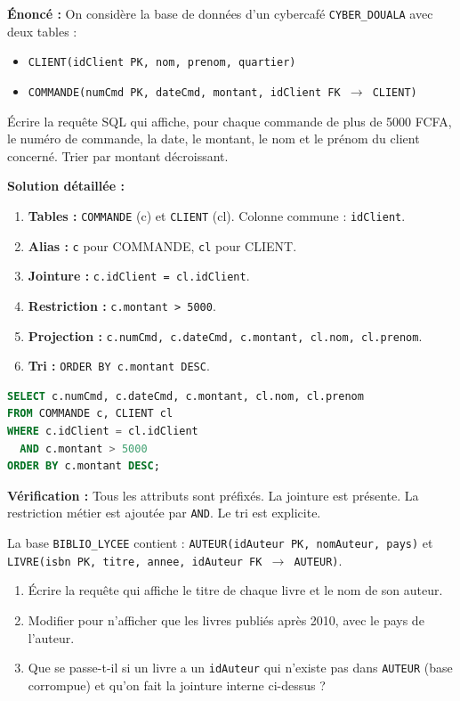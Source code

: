 \documentclass[11pt]{article}
\newcounter{popsec}
\newcounter{popsub}
\newcommand{\courssub}[1]{%
  \stepcounter{popsub}%
  \par\vspace{9pt}\noindent{\popxbold\fontsize{11.5}{13}\selectfont\color{popink}{\color{poporange}\thepopsec.\thepopsub}\hspace{6pt}#1}\par\nopagebreak\vspace{4pt}
}
\begin{document}
\begin{exoresolu}
\textbf{Énoncé :} On considère la base de données d'un cybercafé \texttt{CYBER\_DOUALA} avec deux tables :
\begin{itemize}
\item \texttt{CLIENT(idClient PK, nom, prenom, quartier)}
\item \texttt{COMMANDE(numCmd PK, dateCmd, montant, idClient FK $\rightarrow$ CLIENT)}
\end{itemize}
Écrire la requête SQL qui affiche, pour chaque commande de plus de 5000 FCFA, le numéro de commande, la date, le montant, le nom et le prénom du client concerné. Trier par montant décroissant.

\textbf{Solution détaillée :}
\begin{enumerate}
\item \textbf{Tables :} \texttt{COMMANDE} (c) et \texttt{CLIENT} (cl). Colonne commune : \texttt{idClient}.
\item \textbf{Alias :} \texttt{c} pour COMMANDE, \texttt{cl} pour CLIENT.
\item \textbf{Jointure :} \texttt{c.idClient = cl.idClient}.
\item \textbf{Restriction :} \texttt{c.montant > 5000}.
\item \textbf{Projection :} \texttt{c.numCmd, c.dateCmd, c.montant, cl.nom, cl.prenom}.
\item \textbf{Tri :} \texttt{ORDER BY c.montant DESC}.
\end{enumerate}
\begin{lstlisting}[language=SQL]
SELECT c.numCmd, c.dateCmd, c.montant, cl.nom, cl.prenom
FROM COMMANDE c, CLIENT cl
WHERE c.idClient = cl.idClient
  AND c.montant > 5000
ORDER BY c.montant DESC;
\end{lstlisting}
\textbf{Vérification :} Tous les attributs sont préfixés. La jointure est présente. La restriction métier est ajoutée par \texttt{AND}. Le tri est explicite.
\end{exoresolu}

\courssub{Exercices d'entraînement}

\begin{exercice}
La base \texttt{BIBLIO\_LYCEE} contient :
\texttt{AUTEUR(idAuteur PK, nomAuteur, pays)} et \texttt{LIVRE(isbn PK, titre, annee, idAuteur FK $\rightarrow$ AUTEUR)}.
\begin{enumerate}
\item Écrire la requête qui affiche le titre de chaque livre et le nom de son auteur.
\item Modifier pour n'afficher que les livres publiés après 2010, avec le pays de l'auteur.
\item Que se passe-t-il si un livre a un \texttt{idAuteur} qui n'existe pas dans \texttt{AUTEUR} (base corrompue) et qu'on fait la jointure interne ci-dessus ?
\end{enumerate}
\end{exercice}
\end{document}
